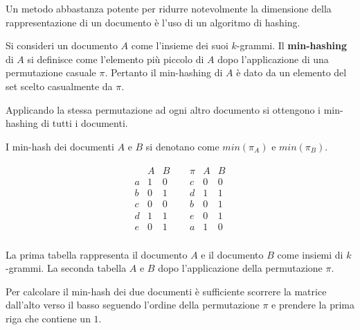     Un metodo abbastanza potente per ridurre notevolmente la dimensione della rappresentazione di un documento è l'uso di un algoritmo di hashing.

    Si consideri un documento $A$ come l'insieme dei suoi $k$-grammi. Il \textbf{min-hashing} di $A$ si definisce come l'elemento più piccolo di $A$ dopo l'applicazione di una permutazione casuale $\pi$. Pertanto il min-hashing di $A$ è dato da un elemento del set scelto casualmente da $\pi$. 

    Applicando la stessa permutazione ad ogni altro documento si ottengono i min-hashing di tutti i documenti.

    \begin{remark}
      I min-hash dei documenti $A$ e $B$ si denotano come $min(\pi_A)$ e $min(\pi_B)$.
    \end{remark}

    \begin{example}\label{ex:pi_perm}
      $$
      \begin{array}{ccc}
        \begin{array}{ccc}
          & A & B \\ \hline
          a & 1 & 0 \\
          b & 0 & 1 \\
          c & 0 & 0 \\
          d & 1 & 1 \\
          e & 0 & 1 \\
        \end{array}
        \ & \
        \begin{array}{ccc}
          \pi & A & B \\ \hline
          c & 0 & 0 \\
          d & 1 & 1 \\
          b & 0 & 1 \\
          e & 0 & 1 \\
          a & 1 & 0 \\
        \end{array}
      \end{array}
      $$

      La prima tabella rappresenta il documento $A$ e il documento $B$ come insiemi di $k$-grammi. La seconda tabella $A$ e $B$ dopo l'applicazione della permutazione $\pi$.
    \end{example}

    Per calcolare il min-hash dei due documenti è sufficiente scorrere la matrice dall'alto verso il basso seguendo l'ordine della permutazione $\pi$ e prendere la prima riga che contiene un $1$.


